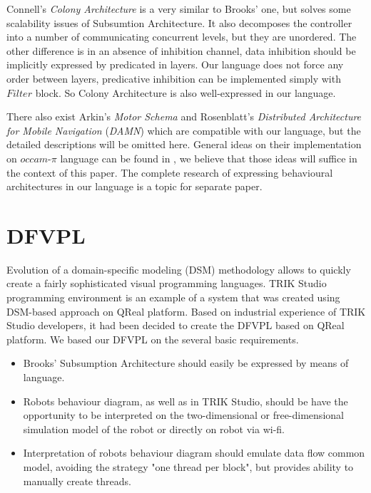 \documentclass[conference,compsoc]{IEEEtran}
\begin{document}
Connell's \textit{Colony Architecture}\cite{connell1989colony} is a very similar to Brooks' one, but solves some scalability issues of Subsumtion Architecture. It also decomposes the controller into a number of communicating concurrent levels, but they are unordered. The other difference is in an absence of inhibition channel, data inhibition should be implicitly expressed by predicated in layers. Our language does not force any order between layers, predicative inhibition can be implemented simply with $Filter$ block. So Colony Architecture is also well-expressed in our language.

There also exist Arkin’s \textit{Motor Schema}\cite{arkin1987motor} and Rosenblatt’s \textit{Distributed Architecture for Mobile Navigation} (\textit{DAMN})\cite{rosenblatt1997damn} which are compatible with our language, but the detailed descriptions will be omitted here. General ideas on their implementation on $occam\mbox{-}\pi$ language can be found in \cite{simpson2009toward}, we believe that those ideas will suffice in the context of this paper. The complete research of expressing behavioural architectures in our language is a topic for separate paper.

\section{DFVPL}
\label{sec:lang}
Evolution of a domain-specific modeling (DSM) methodology allows to quickly create a fairly sophisticated visual programming languages\cite{koznov2008}. TRIK Studio programming environment is an example of a system that was created using DSM-based approach on QReal platform\cite{qrealMeta, kuzenkova2013qreal}. Based on industrial experience of TRIK Studio developers, it had been decided to create the DFVPL based on QReal platform. We based our DFVPL on the several basic requirements.

\begin{itemize}
\item Brooks’ Subsumption Architecture should easily be expressed by means of language.
\item Robots behaviour diagram, as well as in TRIK Studio, should be have the opportunity to be interpreted on the two-dimensional or free-dimensional simulation model of the robot or directly on robot via wi-fi.
\item Interpretation  of robots behaviour diagram  should emulate data flow common model, avoiding the strategy "one thread per block", but provides ability to manually create threads.
\end{itemize}
\end{document}
